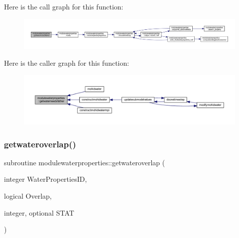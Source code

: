 Here is the call graph for this function\+:\nopagebreak
\begin{figure}[H]
\begin{center}
\leavevmode
\includegraphics[width=350pt]{namespacemodulewaterproperties_a97df80c3a8c997c208dac464d58c0f8c_cgraph}
\end{center}
\end{figure}
Here is the caller graph for this function\+:\nopagebreak
\begin{figure}[H]
\begin{center}
\leavevmode
\includegraphics[width=350pt]{namespacemodulewaterproperties_a97df80c3a8c997c208dac464d58c0f8c_icgraph}
\end{center}
\end{figure}
\mbox{\label{namespacemodulewaterproperties_a923a45b4d978be815b69f1ca9bb63891}} 
\subsubsection{\texorpdfstring{getwateroverlap()}{getwateroverlap()}}
{\footnotesize\ttfamily subroutine modulewaterproperties\+::getwateroverlap (\begin{DoxyParamCaption}\item[{integer}]{Water\+Properties\+ID,  }\item[{logical}]{Overlap,  }\item[{integer, optional}]{S\+T\+AT }\end{DoxyParamCaption})\hspace{0.3cm}{\ttfamily [private]}}

